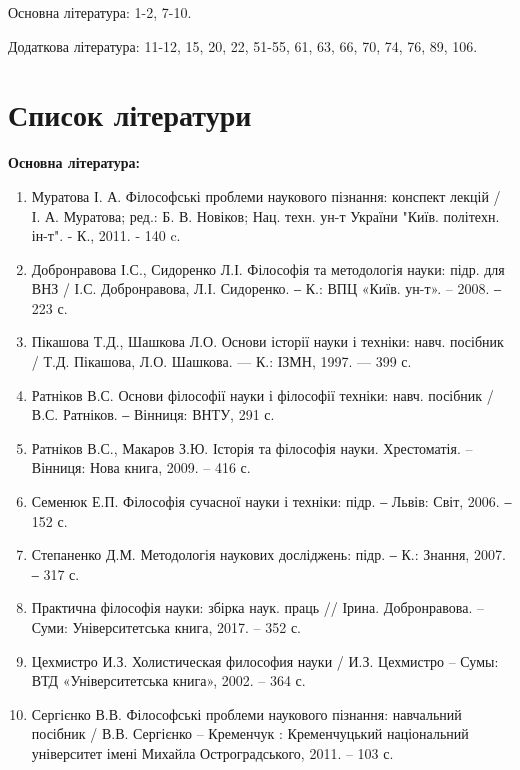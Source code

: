 Основна література: 1-2, 7-10.

Додаткова література: 11-12, 15, 20, 22, 51-55, 61, 63, 66, 70, 74, 76, 89, 106.

\section{Список літератури}

\begin{center}
\textbf{Основна література:}
\end{center}

\begin{enumerate}
\item Муратова І. А. Філософські проблеми наукового пізнання: конспект лекцій /
І. А. Муратова; ред.: Б. В. Новіков; Нац. техн. ун-т України "Київ. політехн.
ін-т". - К., 2011. - 140 c.

\item Добронравова І.С., Сидоренко Л.І. Філософія та методологія науки: підр.
для ВНЗ / І.С. Добронравова, Л.І. Сидоренко. ‒ К.: ВПЦ «Київ. ун-т». – 2008. ‒
223 с.

\item Пікашова Т.Д., Шашкова Л.О. Основи історії науки і техніки: навч.
посібник / Т.Д. Пікашова, Л.О. Шашкова. --- К.: ІЗМН, 1997. --- 399 с.

\item Ратніков В.С. Основи філософії науки і філософії техніки: навч. посібник
/ В.С. Ратніков. ‒ Вінниця: ВНТУ, 291 с.

\item Ратніков В.С., Макаров З.Ю. Історія та філософія науки. Хрестоматія. –
Вінниця: Нова книга, 2009. – 416 с.

\item Семенюк Е.П. Філософія сучасної науки і техніки: підр. ‒ Львів: Світ,
2006. ‒ 152 с.

\item Степаненко Д.М. Методологія наукових досліджень: підр. ‒ К.: Знання,
2007. ‒ 317 с.

\item Практична філософія науки: збірка наук. праць // Ірина. Добронравова. –
Суми: Університетська книга, 2017. – 352 с.

\item Цехмистро И.З. Холистическая философия науки / И.З. Цехмистро –
Сумы: ВТД «Університетська книга», 2002. – 364 с.

\item Сергієнко В.В. Філософські проблеми наукового пізнання: навчальний
посібник / В.В. Сергієнко – Кременчук : Кременчуцький національний
університет імені Михайла Ос\-тро\-град\-сько\-го, 2011. – 103 с.


\end{enumerate}
